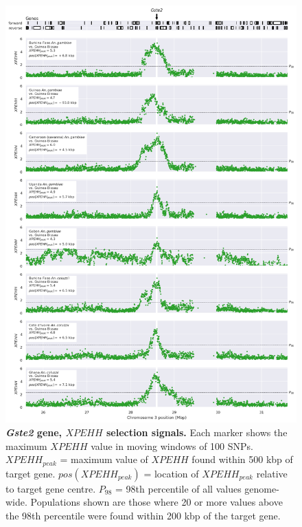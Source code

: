 \documentclass[a4paper,11pt,abstracton,hidelinks]{scrartcl}
\begin{document}
\clearpage


\begin{figure}[t!]
	\begin{center}
		\includegraphics*[width=1\linewidth,center]{artwork/locus_gste2_xpehh_pdist.png}
	\end{center}
	\caption[\textit{Gste2} gene, $XPEHH$ selection signals]{
	\textbf{\textit{Gste2} gene, $XPEHH$ selection signals.}
	Each marker shows the maximum $XPEHH$ value in moving windows of 100 SNPs. 
	$XPEHH_{peak}$ = maximum value of $XPEHH$ found within 500 kbp of target gene. 
	$pos(XPEHH_{peak})$ = location of $XPEHH_{peak}$ relative to target gene centre.
	$P_{98}$ = 98th percentile of all values genome-wide.
	Populations shown are those where 20 or more values above the 98th percentile were found within 200 kbp of the target gene.
	} 
	\label{fig:locus_gste2_xpehh}
\end{figure}
\end{document}
